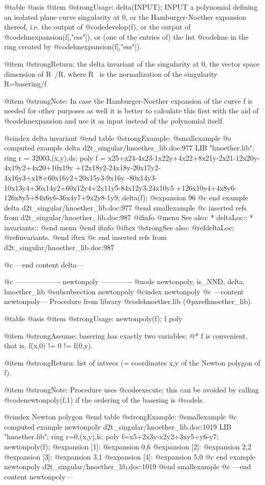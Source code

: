 @table @asis
@item @strong{Usage:}
delta(INPUT); INPUT a polynomial defining an isolated plane curve
singularity at 0, or the Hamburger-Noether expansion thereof, i.e.
the output of @code{develop(f)}, or the output of @code{hnexpansion(f[,"ess"])},
or (one of the entries of) the list @code{hne} in the ring created
by @code{hnexpansion(f[,"ess"])}.

@item @strong{Return:}
the delta invariant of the singularity at 0, the vector space
dimension of R~/R, where R~ is the normalization of the
singularity R=basering/f

@item @strong{Note:}
In case the Hamburger-Noether expansion of the curve f is needed
for other purposes as well it is better to calculate this first
with the aid of @code{hnexpansion} and use it as input instead of
the polynomial itself.

@cindex delta invariant
@end table
@strong{Example:}
@smallexample
@c computed example delta d2t_singular/hnoether_lib.doc:977 
LIB "hnoether.lib";
ring r = 32003,(x,y),ds;
poly f = x25+x24-4x23-1x22y+4x22+8x21y-2x21-12x20y-4x19y2+4x20+10x19y
+12x18y2-24x18y-20x17y2-4x16y3+x18+60x16y2+20x15y3-9x16y
-80x14y3-10x13y4+36x14y2+60x12y4+2x11y5-84x12y3-24x10y5
+126x10y4+4x8y6-126x8y5+84x6y6-36x4y7+9x2y8-1y9;
delta(f);
@expansion{} 96
@c end example delta d2t_singular/hnoether_lib.doc:977
@end smallexample
@c inserted refs from d2t_singular/hnoether_lib.doc:987
@ifinfo
@menu
See also:
* deltaLoc::
* invariants::
@end menu
@end ifinfo
@iftex
@strong{See also:}
@ref{deltaLoc};
@ref{invariants}.
@end iftex
@c end inserted refs from d2t_singular/hnoether_lib.doc:987

@c ---end content delta---

@c ------------------- newtonpoly -------------
@node newtonpoly, is_NND, delta, hnoether_lib
@subsubsection newtonpoly
@cindex newtonpoly
@c ---content newtonpoly---
Procedure from library @code{hnoether.lib} (@pxref{hnoether_lib}).

@table @asis
@item @strong{Usage:}
newtonpoly(f); f poly

@item @strong{Assume:}
basering has exactly two variables; @*
f is convenient, that is, f(x,0) != 0 != f(0,y).

@item @strong{Return:}
list of intvecs (= coordinates x,y of the Newton polygon of f).

@item @strong{Note:}
Procedure uses @code{execute}; this can be avoided by calling
@code{newtonpoly(f,1)} if the ordering of the basering is @code{ls}.

@cindex Newton polygon
@end table
@strong{Example:}
@smallexample
@c computed example newtonpoly d2t_singular/hnoether_lib.doc:1019 
LIB "hnoether.lib";
ring r=0,(x,y),ls;
poly f=x5+2x3y-x2y2+3xy5+y6-y7;
newtonpoly(f);
@expansion{} [1]:
@expansion{}    0,6
@expansion{} [2]:
@expansion{}    2,2
@expansion{} [3]:
@expansion{}    3,1
@expansion{} [4]:
@expansion{}    5,0
@c end example newtonpoly d2t_singular/hnoether_lib.doc:1019
@end smallexample
@c ---end content newtonpoly---

